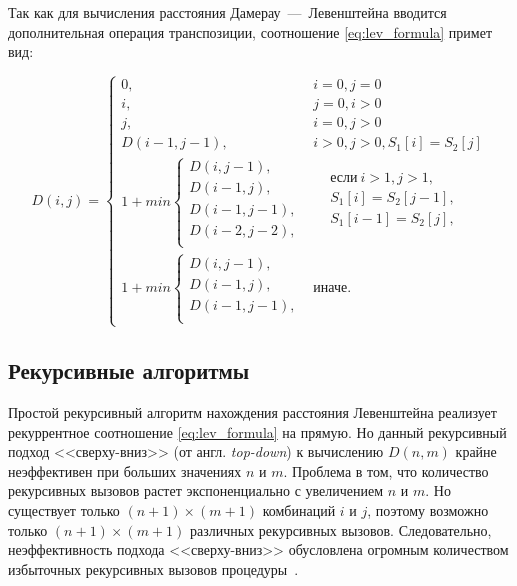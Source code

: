 Так как для вычисления расстояния Дамерау~---~Левенштейна вводится дополнительная операция транспозиции, соотношение \ref{eq:lev_formula} примет вид:

\begin{equation}
\label{eqn:dam_lev_formula}
	D(i, j) = 
	\begin{cases}
		0, & i = 0, j = 0\\
            i, & j = 0, i > 0\\
            j, & i = 0, j > 0\\
            D(i-1, j-1), & i > 0, j > 0, S_1[i] = S_2[j]\\
		1 + min \begin{cases}
			D(i, j - 1),\\
			D(i - 1, j),\\
			D(i - 1, j - 1), \\
			D(i - 2, j - 2), \\
		\end{cases}
		& \begin{aligned}
			& \text{если} \ i > 1, j > 1, \\
			& S_{1}[i] = S_{2}[j - 1], \\
			& S_{1}[i - 1] = S_{2}[j], \\
		\end{aligned}\\
		1 + min \begin{cases}
			D(i, j - 1),\\
			D(i - 1, j), \\
			D(i - 1, j - 1), \\
		\end{cases}
		 & \text{иначе.}
	\end{cases}
\end{equation}

\subsection{Рекурсивные алгоритмы}\label{sect:recur_lev}

Простой рекурсивный алгоритм нахождения расстояния Левенштейна реализует рекуррентное соотношение \ref{eq:lev_formula} на прямую. Но данный рекурсивный подход <<сверху-вниз>> (от англ. \textit{top-down}) к вычислению \(D(n, m)\) крайне неэффективен при больших значениях \(n\) и \(m\). Проблема в том, что количество рекурсивных вызовов растет экспоненциально с увеличением \(n\) и \(m\). Но существует только \((n + 1) \times (m + 1)\) комбинаций \(i\) и \(j\), поэтому возможно только \((n + 1) \times (m + 1)\) различных рекурсивных вызовов. Следовательно, неэффективность подхода <<сверху-вниз>> обусловлена огромным количеством избыточных рекурсивных вызовов процедуры~\cite{cambridge}.


